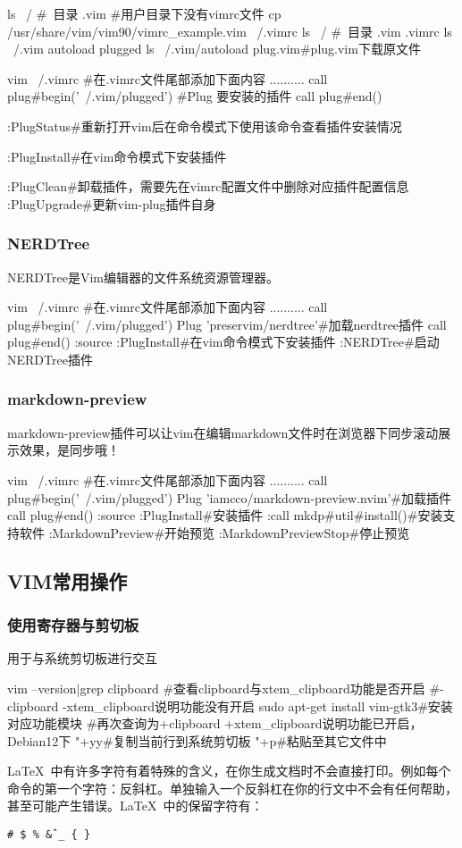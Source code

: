 \begin{shell}
ls ~/ #~目录
.vim
#用户目录下没有vimrc文件
cp /usr/share/vim/vim90/vimrc_example.vim ~/.vimrc
ls ~/ #~目录
.vim .vimrc
ls ~/.vim
autoload plugged
ls ~/.vim/autoload
plug.vim#plug.vim下载原文件

vim ~/.vimrc #在.vimrc文件尾部添加下面内容
..........
call plug#begin('~/.vim/plugged')
#Plug 要安装的插件
call plug#end()

:PlugStatus#重新打开vim后在命令模式下使用该命令查看插件安装情况

:PlugInstall#在vim命令模式下安装插件

:PlugClean#卸载插件，需要先在vimrc配置文件中删除对应插件配置信息
:PlugUpgrade#更新vim-plug插件自身
\end{shell}


\subsubsection{NERDTree}
NERDTree是Vim编辑器的文件系统资源管理器。
\begin{shell}
vim ~/.vimrc #在.vimrc文件尾部添加下面内容
..........
call plug#begin('~/.vim/plugged')
Plug 'preservim/nerdtree'#加载nerdtree插件
call plug#end()
:source %
:PlugInstall#在vim命令模式下安装插件
:NERDTree#启动NERDTree插件
\end{shell}
\subsubsection{markdown-preview}
markdown-preview插件可以让vim在编辑markdown文件时在浏览器下同步滚动展示效果，是同步哦！
\begin{shell}
vim ~/.vimrc #在.vimrc文件尾部添加下面内容
..........
call plug#begin('~/.vim/plugged')
Plug 'iamcco/markdown-preview.nvim'#加载插件
call plug#end()
:source %
:PlugInstall#安装插件
:call mkdp#util#install()#安装支持软件
:MarkdownPreview#开始预览
:MarkdownPreviewStop#停止预览
\end{shell}
\subsection{VIM常用操作}
\subsubsection{使用寄存器与剪切板}
	用于与系统剪切板进行交互
\begin{shell}
vim --version|grep clipboard #查看clipboard与xtem_clipboard功能是否开启
#-clipboard -xtem_clipboard说明功能没有开启
sudo apt-get install vim-gtk3#安装对应功能模块
#再次查询为+clipboard +xtem_clipboard说明功能已开启，Debian12下
"+yy#复制当前行到系统剪切板
"+p#粘贴至其它文件中
\end{shell}
\LaTeX\ 中有许多字符有着特殊的含义，在你生成文档时不会直接打印。例如每个命令的第一个字符：反斜杠。单独输入一个反斜杠在你的行文中不会有任何帮助，甚至可能产生错误。\LaTeX\ 中的保留字符有：
\begin{center}
	\texttt{\# \$ \% \^ \& \_ \{ \} }
\end{center}


